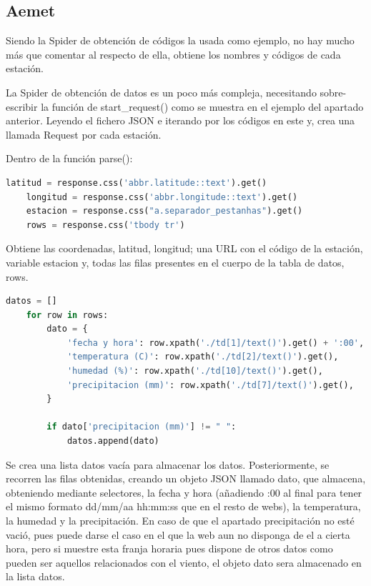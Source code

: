 \subsection{Aemet}
Siendo la Spider de obtención de códigos la usada como ejemplo, no hay mucho más que comentar al respecto de ella, obtiene los nombres y códigos de cada estación.

La Spider de obtención de datos es un poco más compleja, necesitando sobre-escribir la función de start\_request() como se muestra en el ejemplo del apartado anterior. Leyendo el fichero JSON e iterando por los códigos en este y, crea una llamada Request por cada estación.

Dentro de la función parse():

\begin{lstlisting}[language=Python, caption={Selector Aemet Data Spider}]
	latitud = response.css('abbr.latitude::text').get()
	longitud = response.css('abbr.longitude::text').get()
	estacion = response.css("a.separador_pestanhas").get()
	rows = response.css('tbody tr')
\end{lstlisting}

Obtiene las coordenadas, latitud, longitud; una URL con el código de la estación, variable estacion y, todas las filas presentes en el cuerpo de la tabla de datos, rows.

\begin{lstlisting}[language=Python, caption={Trabajar sobre los datos de Aemet Data Spider}]
	datos = []
	for row in rows:
		dato = {
			'fecha y hora': row.xpath('./td[1]/text()').get() + ':00',
			'temperatura (C)': row.xpath('./td[2]/text()').get(),
			'humedad (%)': row.xpath('./td[10]/text()').get(),
			'precipitacion (mm)': row.xpath('./td[7]/text()').get(),
		}
		
		if dato['precipitacion (mm)'] != " ":
			datos.append(dato)
\end{lstlisting}

Se crea una lista datos vacía para almacenar los datos. Posteriormente, se recorren las filas obtenidas, creando un objeto JSON llamado dato, que almacena, obteniendo mediante selectores, la fecha y hora (añadiendo :00 al final para tener el mismo formato dd/mm/aa hh:mm:ss que en el resto de webs), la temperatura, la humedad y la precipitación.\newline
\newline
En caso de que el apartado precipitación no esté vació, pues puede darse el caso en el que la web aun no disponga de el a cierta hora, pero si muestre esta franja horaria pues dispone de otros datos como pueden ser aquellos relacionados con el viento, el objeto dato sera almacenado en la lista datos.

